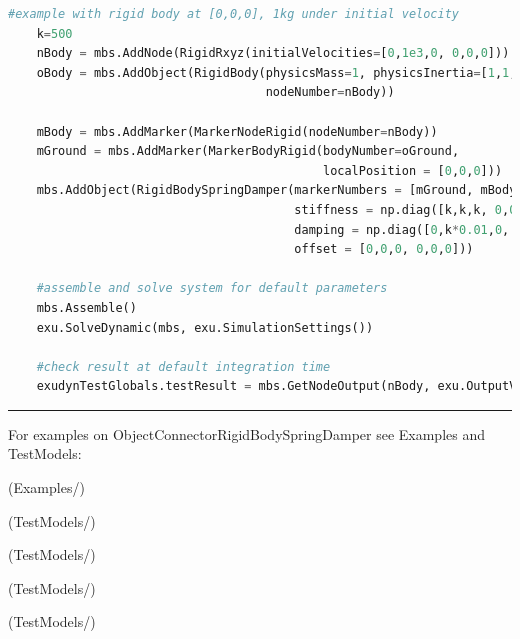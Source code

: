 \begin{lstlisting}[language=Python, firstnumber=1]
    #example with rigid body at [0,0,0], 1kg under initial velocity
    k=500
    nBody = mbs.AddNode(RigidRxyz(initialVelocities=[0,1e3,0, 0,0,0]))
    oBody = mbs.AddObject(RigidBody(physicsMass=1, physicsInertia=[1,1,1,0,0,0], 
                                    nodeNumber=nBody))
    
    mBody = mbs.AddMarker(MarkerNodeRigid(nodeNumber=nBody))
    mGround = mbs.AddMarker(MarkerBodyRigid(bodyNumber=oGround, 
                                            localPosition = [0,0,0]))
    mbs.AddObject(RigidBodySpringDamper(markerNumbers = [mGround, mBody], 
                                        stiffness = np.diag([k,k,k, 0,0,0]), 
                                        damping = np.diag([0,k*0.01,0, 0,0,0]), 
                                        offset = [0,0,0, 0,0,0]))
    
    #assemble and solve system for default parameters
    mbs.Assemble()
    exu.SolveDynamic(mbs, exu.SimulationSettings())
    
    #check result at default integration time
    exudynTestGlobals.testResult = mbs.GetNodeOutput(nBody, exu.OutputVariableType.Displacement)[1] 

\end{lstlisting}

\vspace{6pt}\par\noindent\rule{\textwidth}{0.4pt}
%
\noindent For examples on ObjectConnectorRigidBodySpringDamper see Examples and TestModels:
\bi
\item {} (Examples/)
\item {} (TestModels/)
\item {} (TestModels/)
\item {} (TestModels/)
\item {} (TestModels/)
\ei

